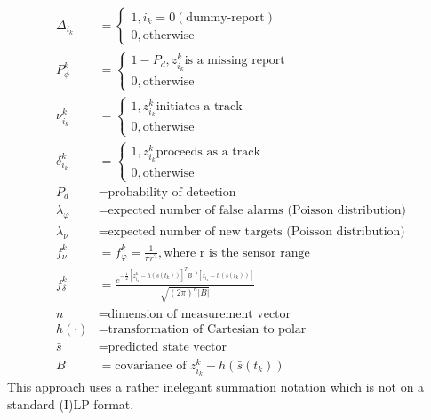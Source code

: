 \begin{equation*}
\begin{split}
	\Delta_{i_k} 	&= 
		\begin{cases} 
			1, i_k=0 (\text{dummy-report}) \\ 
			0, \text{otherwise} 
		\end{cases} \\
	P_\phi^k 		&=
		\begin{cases} 
			1-P_d, z_{i_k}^k \text{is a missing report} \\ 
			0, \text{otherwise} 
		\end{cases} \\
	\nu_{i_k}^k 	&=
		\begin{cases} 
			1, z_{i_k}^k \text{initiates a track} \\ 
			0, \text{otherwise} 
		\end{cases} \\
	\delta_{i_k}^k 	&=
		\begin{cases} 
			1, z_{i_k}^k \text{proceeds as a track} \\ 
			0, \text{otherwise} 
		\end{cases} \\
	P_d 			&= \text{probability of detection} \\
	\lambda_\varphi &= \text{expected number of false alarms (Poisson distribution)} \\
	\lambda_\nu		&= \text{expected number of new targets (Poisson distribution)} \\
	f_\nu^k 		&= f_\varphi^k = \frac{1}{\pi r^2}, \text{where r is the sensor range} \\
	f_\delta^k 		&= \frac{e^{-\frac{1}{2}[z_{i_k}^k-h(\bar{s}(t_k))]^T B^{-1} [z_{i_k}-h(\bar{s}(t_k))] }}{\sqrt{(2\pi)^n |B|}} \\
	n 				&= \text{dimension of measurement vector} \\
	h(\cdot)		&= \text{transformation of Cartesian to polar} \\
	\bar{s}			&= \text{predicted state vector} \\
	B 				&= \text{covariance of } z_{i_k}^k - h(\bar{s}(t_k))
\end{split}
\end{equation*}
This approach uses a rather inelegant summation notation which is not on a standard (I)LP format. 

